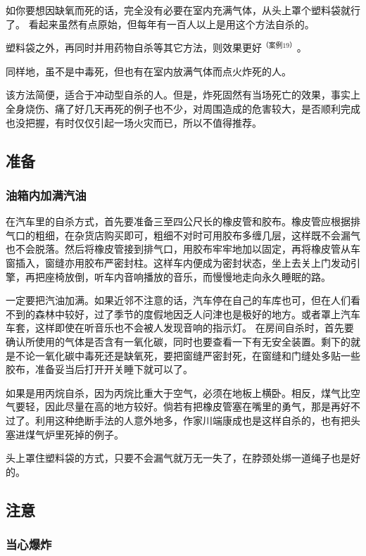 \documentclass[UTF8]{ctexart}
\begin{document}
如你要想因缺氧而死的话，完全没有必要在室内充满气体，从头上罩个塑料袋就行了。
看起来虽然有点原始，但每年有一百人以上是用这个方法自杀的。

塑料袋之外，再同时并用药物自杀等其它方法，则效果更好$^{（案例 19）}$。
 
同样地，虽不是中毒死，但也有在室内放满气体而点火炸死的人。

该方法简便，适合于冲动型自杀的人。但是，炸死固然有当场死亡的效果，事实上全身烧伤、痛了好几天再死的例子也不少，对周围造成的危害较大，是否顺利完成也没把握，有时仅仅引起一场火灾而已，所以不值得推荐。

\subsection{准备}

\subsubsection*{油箱内加满汽油}

在汽车里的自杀方式，首先要准备三至四公尺长的橡皮管和胶布。橡皮管应根据排气口的粗细，在杂货店购买即可，粗细不对时可用胶布多缠几层，这样既不会漏气也不会脱落。然后将橡皮管接到排气口，用胶布牢牢地加以固定，再将橡皮管从车窗插入，窗缝亦用胶布严密封柱。这样车内便成为密封状态，坐上去关上门发动引擎，再把座椅放倒，听车内音响播放的音乐，而慢慢地走向永久睡眠的路。

一定要把汽油加满。如果近邻不注意的话，汽车停在自己的车库也可，但在人们看不到的森林中较好，过了季节的度假地因乏人问津也是极好的地方。或者罩上汽车车套，这样即使在听音乐也不会被人发现音响的指示灯。
在房间自杀时，首先要确认所使用的气体是否含有一氧化碳，同时也要查看一下有无安全装置。剩下的就是不论一氧化碳中毒死还是缺氧死，要把窗缝严密封死，在窗缝和门缝处多贴一些胶布，准备妥当后打开开关睡下就可以了。

如果是用丙烷自杀，因为丙烷比重大于空气，必须在地板上横卧。相反，煤气比空气要轻，因此尽量在高的地方较好。倘若有把橡皮管塞在嘴里的勇气，那是再好不过了。利用这种绝断手法的人意外地多，作家川端康成也是这样自杀的，也有把头塞进煤气炉里死掉的例子。

头上罩住塑料袋的方式，只要不会漏气就万无一失了，在脖颈处绑一道绳子也是好的。

\subsection{注意}

\subsubsection*{当心爆炸}
\end{document}
